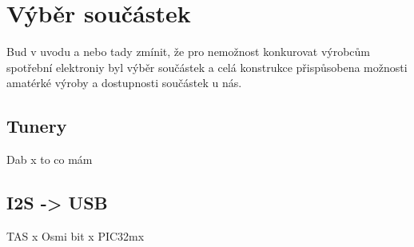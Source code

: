 \section{Výběr součástek}
\label{sec:Vyber}

Bud v uvodu a nebo tady zmínit, že pro nemožnost konkurovat výrobcům spotřební elektroniy byl výběr součástek a celá konstrukce přispůsobena možnosti amatérké výroby a dostupnosti součástek u nás.

\subsection{Tunery}
	Dab x to co mám
\subsection{I2S -> USB}
	TAS x Osmi bit x PIC32mx
